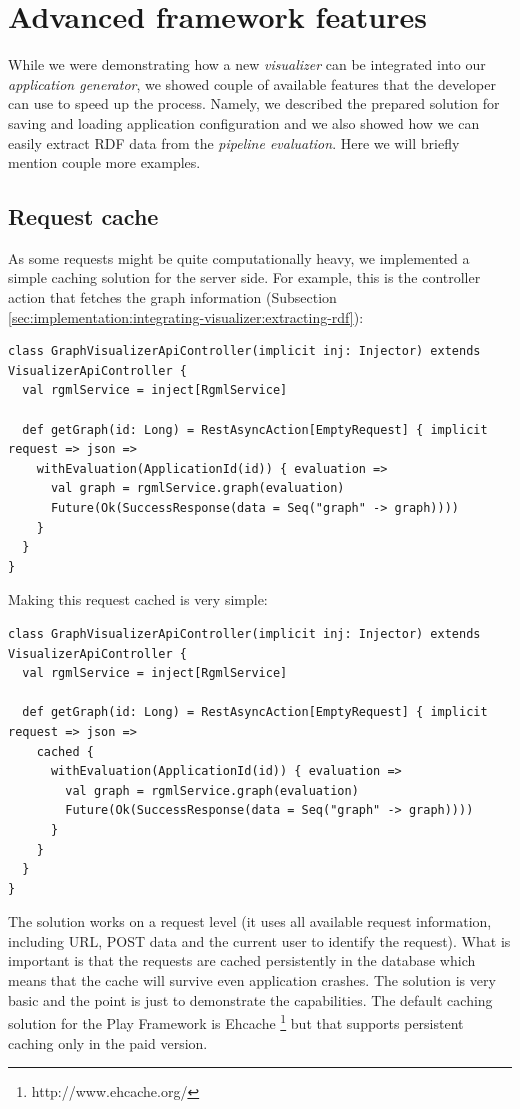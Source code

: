 \section{Advanced framework features}

While we were demonstrating how a new \emph{visualizer} can be integrated into our \emph{application generator}, we showed couple of available features that the developer can use to speed up the process. Namely, we described the prepared solution for saving and loading application configuration and we also showed how we can easily extract RDF data from the \emph{pipeline evaluation}. Here we will briefly mention couple more examples.

\subsection{Request cache}

As some requests might be quite computationally heavy, we implemented a simple caching solution for the server side. For example, this is the controller action that fetches the graph information (Subsection \ref{sec:implementation:integrating-visualizer:extracting-rdf}):

\begin{verbatim}
class GraphVisualizerApiController(implicit inj: Injector) extends VisualizerApiController {
  val rgmlService = inject[RgmlService]

  def getGraph(id: Long) = RestAsyncAction[EmptyRequest] { implicit request => json =>
    withEvaluation(ApplicationId(id)) { evaluation =>
      val graph = rgmlService.graph(evaluation)
      Future(Ok(SuccessResponse(data = Seq("graph" -> graph))))
    }
  }
}
\end{verbatim}

Making this request cached is very simple:

\begin{verbatim}
class GraphVisualizerApiController(implicit inj: Injector) extends VisualizerApiController {
  val rgmlService = inject[RgmlService]

  def getGraph(id: Long) = RestAsyncAction[EmptyRequest] { implicit request => json =>
    cached {
      withEvaluation(ApplicationId(id)) { evaluation =>
        val graph = rgmlService.graph(evaluation)
        Future(Ok(SuccessResponse(data = Seq("graph" -> graph))))
      }
    }
  }
}
\end{verbatim}

The solution works on a request level (it uses all available request information, including URL, POST data and the current user to identify the request). What is important is that the requests are cached persistently in the database which means that the cache will survive even application crashes. The solution is very basic and the point is just to demonstrate the capabilities. The default caching solution for the Play Framework is Ehcache \footnote{http://www.ehcache.org/} but that supports persistent caching only in the paid version.

